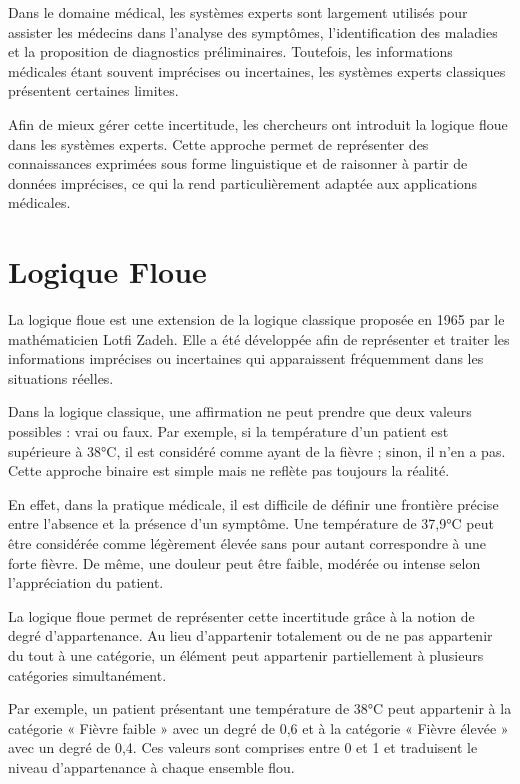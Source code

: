 \documentclass[a4paper,12pt]{report} %
\begin{document}
Dans le domaine médical, les systèmes experts sont largement utilisés pour assister les médecins dans l'analyse des symptômes, l'identification des maladies et la proposition de diagnostics préliminaires. Toutefois, les informations médicales étant souvent imprécises ou incertaines, les systèmes experts classiques présentent certaines limites.

Afin de mieux gérer cette incertitude, les chercheurs ont introduit la logique floue dans les systèmes experts. Cette approche permet de représenter des connaissances exprimées sous forme linguistique et de raisonner à partir de données imprécises, ce qui la rend particulièrement adaptée aux applications médicales.

\section{Logique Floue}

La logique floue est une extension de la logique classique proposée en 1965 par le mathématicien Lotfi Zadeh. Elle a été développée afin de représenter et traiter les informations imprécises ou incertaines qui apparaissent fréquemment dans les situations réelles.

Dans la logique classique, une affirmation ne peut prendre que deux valeurs possibles : vrai ou faux. Par exemple, si la température d'un patient est supérieure à 38°C, il est considéré comme ayant de la fièvre ; sinon, il n'en a pas. Cette approche binaire est simple mais ne reflète pas toujours la réalité.

En effet, dans la pratique médicale, il est difficile de définir une frontière précise entre l'absence et la présence d'un symptôme. Une température de 37,9°C peut être considérée comme légèrement élevée sans pour autant correspondre à une forte fièvre. De même, une douleur peut être faible, modérée ou intense selon l'appréciation du patient.

La logique floue permet de représenter cette incertitude grâce à la notion de degré d'appartenance. Au lieu d'appartenir totalement ou de ne pas appartenir du tout à une catégorie, un élément peut appartenir partiellement à plusieurs catégories simultanément.

Par exemple, un patient présentant une température de 38°C peut appartenir à la catégorie « Fièvre faible » avec un degré de 0,6 et à la catégorie « Fièvre élevée » avec un degré de 0,4. Ces valeurs sont comprises entre 0 et 1 et traduisent le niveau d'appartenance à chaque ensemble flou.
\end{document}
